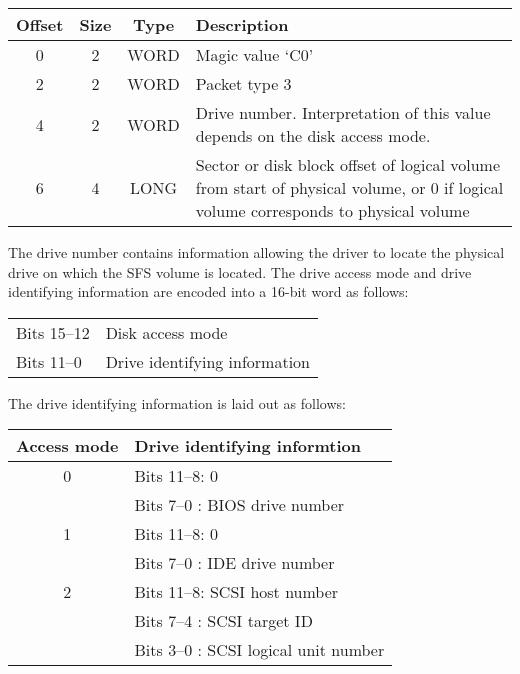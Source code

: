 \begin{itemize}
\begin{center}
\begin{tabular}{|c|c|c|p{212.4pt}|}
\hline
    Offset & Size  &  Type  &      Description\\
\hline
       0   &   2   &  WORD  &      Magic value `C0'\\
       2   &   2   &  WORD  &      Packet type 3\\
       4   &   2   &  WORD  &      Drive number.  Interpretation of this value
                                   depends on the disk access mode.\\
       6   &   4   &  LONG  &      Sector or disk block offset of logical volume 
				   from start of physical volume, or 0 if logical 
				   volume corresponds to physical volume\\
\hline
\end{tabular}
\end{center}

The drive number contains information allowing the driver to locate the
physical drive on which the SFS volume is located.  The drive access mode and
drive identifying information are encoded into a 16-bit word as follows:

\begin{center}
\begin{tabular}{|l|l|}
\hline
    Bits 15--12 & Disk access mode\\
    Bits 11--0  & Drive identifying information\\
\hline
\end{tabular}
\end{center}

The drive identifying information is laid out as follows:

\begin{center}
\begin{tabular}{|c|l|}
\hline
    Access mode   &  Drive identifying informtion\\
\hline
         0        &  Bits 11--8: 0\\
                  &  Bits 7--0 : BIOS drive number\\
         1        &  Bits 11--8: 0\\
                  &  Bits 7--0 : IDE drive number\\
         2        &  Bits 11--8: SCSI host number\\
                  &  Bits 7--4 : SCSI target ID\\
                  &  Bits 3--0 : SCSI logical unit number\\
\hline
\end{tabular}
\end{center}


\end{itemize}
